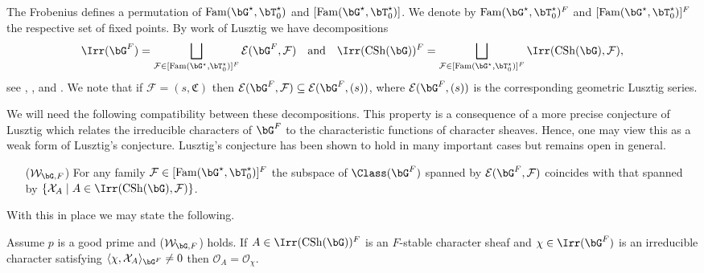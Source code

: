 \documentclass[eqthmnum,nocolour,skinny]{jt-calcs}
\DeclareMathOperator{\CS}{CSh}
\DeclareMathOperator{\Fam}{Fam}
\begin{document}
\begin{pa}
The Frobenius defines a permutation of $\Fam(\bG^{\star},\bT_0^{\star})$ and $[\Fam(\bG^{\star},\bT_0^{\star})]$. We denote by $\Fam(\bG^{\star},\bT_0^{\star})^F$ and $[\Fam(\bG^{\star},\bT_0^{\star})]^F$ the respective set of fixed points. By work of Lusztig we have decompositions
\begin{equation*}
\Irr(\bG^F) = \bigsqcup_{\mathcal{F} \in [\Fam(\bG^{\star},\bT_0^{\star})]^F} \mathcal{E}(\bG^F,\mathcal{F}) \quad \text{and} \quad \Irr(\CS(\bG))^F = \bigsqcup_{\mathcal{F} \in [\Fam(\bG^{\star},\bT_0^{\star})]^F} \Irr(\CS(\bG),\mathcal{F}),
\end{equation*}
see \cite[10.6, 11.1]{lusztig:1992:a-unipotent-support}, \cite[16.7]{lusztig:1985:character-sheaves}, and \cite[13.1, 14.7]{taylor:2016:GGGRs-small-characteristics}. We note that if $\mathcal{F} = (s,\mathfrak{C})$ then $\mathcal{E}(\bG^F,\mathcal{F}) \subseteq \mathcal{E}(\bG^F,(s))$, where $\mathcal{E}(\bG^F,(s))$ is the corresponding geometric Lusztig series.
\end{pa}

\begin{pa}\label{pa:weak-Lusztig-conj}
We will need the following compatibility between these decompositions. This property is a consequence of a more precise conjecture of Lusztig which relates the irreducible characters of $\bG^F$ to the characteristic functions of character sheaves. Hence, one may view this as a weak form of Lusztig's conjecture. Lusztig's conjecture has been shown to hold in many important cases but remains open in general.
\begin{enumerate}[leftmargin=1.5cm]
	\item[($\mathcal{W}_{\bG,F}$)] For any family $\mathcal{F} \in [\Fam(\bG^{\star},\bT_0^{\star})]^F$ the subspace of $\Class(\bG^F)$ spanned by $\mathcal{E}(\bG^F,\mathcal{F})$ coincides with that spanned by $\{\mathcal{X}_A \mid A \in \Irr(\CS(\bG),\mathcal{F})\}$.
\end{enumerate}
With this in place we may state the following.
\end{pa}

\begin{lem}\label{lem:equal-supports}
Assume $p$ is a good prime and ($\mathcal{W}_{\bG,F}$) holds. If $A \in \Irr(\CS(\bG))^F$ is an $F$-stable character sheaf and $\chi \in \Irr(\bG^F)$ is an irreducible character satisfying $\langle \chi, \mathcal{X}_A \rangle_{\bG^F} \neq 0$ then $\mathcal{O}_A = \mathcal{O}_{\chi}$.
\end{lem}
\end{document}
